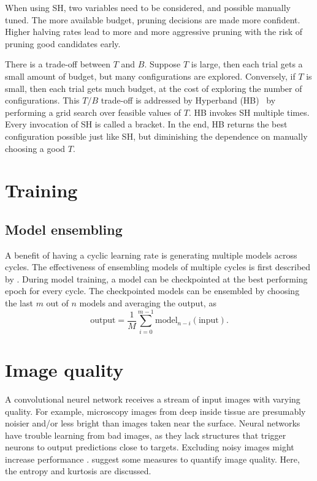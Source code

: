 When using SH, two variables need to be considered, and possible manually tuned.
The more available budget, pruning decisions are made more confident.
Higher halving rates lead to more and more aggressive pruning with the risk of pruning good candidates early.

There is a trade-off between $T$ and $B$.
Suppose $T$ is large, then each trial gets a small amount of budget, but many configurations are explored.
Conversely, if $T$ is small, then each trial gets much budget, at the cost of exploring the number of configurations.
This $T/B$ trade-off is addressed by Hyperband (HB)~\cite{Li2016} by performing a grid search over feasible values of $T$.
HB invokes SH multiple times.
Every invocation of SH is called a bracket.
In the end, HB returns the best configuration possible just like SH, but diminishing the dependence on manually choosing a good $T$.

\section{Training}\label{Training}
\subsection{Model ensembling}\label{subsec:model_ensembling}
A benefit of having a cyclic learning rate is generating multiple models across cycles.
The effectiveness of ensembling models of multiple cycles is first described by \textcite{Huang2017}.
During model training, a model can be checkpointed at the best performing epoch for every cycle.
The checkpointed models can be ensembled by choosing the last $m$ out of $n$ models and averaging the output, as
\begin{equation}
    \mathrm{output} = \frac{1}{M} \sum_{i=0}^{m-1} \mathrm{model}_{n-i}(\mathrm{input}).
\end{equation}



\section{Image quality}\label{subsec:imq}
A convolutional neurel network receives a stream of input images with varying quality.
For example, microscopy images from deep inside tissue are presumably noisier and/or less bright than images taken near the surface.
Neural networks have trouble learning from bad images, as they lack structures that trigger neurons to output predictions close to targets.
Excluding noisy images might increase performance \cite{Blokker2022}.
\textcite{Koho2016} suggest some measures to quantify image quality.
Here, the entropy and kurtosis are discussed.

